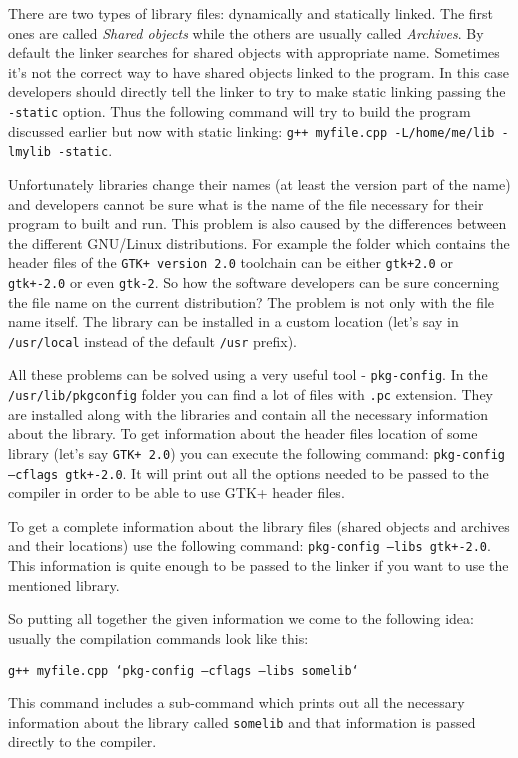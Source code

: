 There are two types of library files: dynamically and statically linked. The first ones are called \textit {Shared objects} while the others are usually called  \textit {Archives}. By default the linker searches for shared objects with appropriate name. Sometimes it's not the correct way to have shared objects linked to the program. In this case developers should directly tell the linker to try to make static linking passing the {\tt -static} option. Thus the following command will try to build the program discussed earlier but now with static linking: {\tt g++ myfile.cpp -L/home/me/lib -lmylib -static}. 

Unfortunately libraries change their names (at least the version part of the name) and developers cannot be sure what is the name of the file necessary for their program to built and run. This problem is also caused by the differences between the different GNU/Linux distributions. For example the folder which contains the header files of the {\tt GTK+ version 2.0} toolchain can be either {\tt gtk+2.0} or {\tt gtk+-2.0} or even {\tt gtk-2}. So how the software developers can be sure concerning the file name on the current distribution? The problem is not only with the file name itself. The library can be installed in a custom location (let's say in {\tt /usr/local} instead of the default {\tt /usr} prefix).

All these problems can be solved using a very useful tool - {\tt pkg-config}. In the {\tt /usr/lib/pkgconfig} folder you can find a lot of files with {\tt .pc} extension. They are installed along with the libraries and contain all the necessary information about the library. To get information about the header files location of some library (let's say {\tt GTK+ 2.0}) you can execute the following command: {\tt pkg-config --cflags gtk+-2.0}. It will print out all the options needed to be passed to the compiler in order to be able to use GTK+ header files.

To get a complete information about the library files (shared objects and archives and their locations) use the following command: {\tt pkg-config --libs gtk+-2.0}. This information is quite enough to be passed to the linker if you want to use the mentioned library.

So putting all together the given information we come to the following idea: usually the compilation commands look like this:

{\tt g++ myfile.cpp  `pkg-config --cflags --libs somelib` }

This command includes a sub-command which prints out all the necessary information about the library called {\tt somelib} and that information is passed directly to the compiler.
